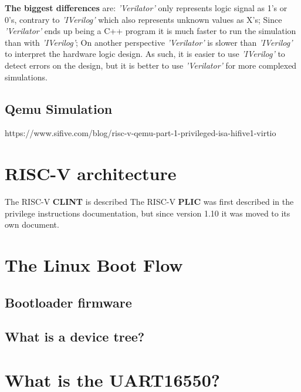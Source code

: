 \textbf{The biggest differences} are: \textit{'Verilator'} only represents logic signal as 1's or 0's, contrary to \textit{'IVerilog'} which also represents unknown values as X's; Since \textit{'Verilator'} ends up being a C++ program it is much faster to run the simulation than with \textit{'IVerilog'}; On another perspective \textit{'Verilator'} is slower than \textit{'IVerilog'} to interpret the hardware logic design.
As such, it is easier to use \textit{'IVerilog'} to detect errors on the design, but it is better to use \textit{'Verilator'} for more complexed simulations.

\subsection{Qemu Simulation}
https://www.sifive.com/blog/risc-v-qemu-part-1-privileged-isa-hifive1-virtio

\section{RISC-V architecture}
The RISC-V \textbf{CLINT} is described
The RISC-V \textbf{PLIC} was first described in the privilege instructions documentation, but since version 1.10 it was moved to its own document.

\section{The Linux Boot Flow}
\subsection{Bootloader firmware}
\subsection{What is a device tree?}

\section{What is the UART16550?}


